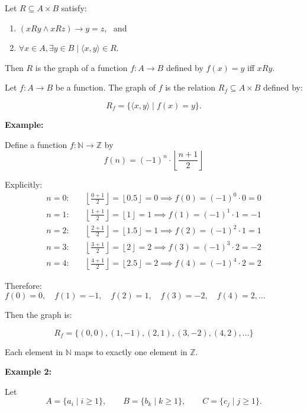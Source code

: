 \documentclass[12pt,a4paper,openany]{article}
\begin{document}
Let $R \subseteq A \times B$ satisfy:

\begin{enumerate}
\item $(xRy \land xRz) \to y = z$, \ and
\item $\forall x \in A, \exists y \in B \mid \langle x, y \rangle \in R$.
\end{enumerate}

Then $R$ is the graph of a function $f : A \to B$ defined by $f(x) = y$ iff $xRy$.

Let $f : A \to B$ be a function. The graph of $f$ is the relation $R_f \subseteq A \times B$ defined by:

\[
R_f = \{ \langle x, y \rangle \mid f(x) = y \}.
\]

\textbf{Example:}

Define a function $f : \mathbb{N} \to \mathbb{Z}$ by
\[
f(n) = (-1)^n \cdot \left\lfloor \frac{n+1}{2} \right\rfloor
\]

Explicitly:
\[
\begin{aligned}
n = 0: & \quad \left\lfloor \frac{0+1}{2} \right\rfloor = \left\lfloor 0.5 \right\rfloor = 0 \implies f(0) = (-1)^0 \cdot 0 = 0 \\
n = 1: & \quad \left\lfloor \frac{1+1}{2} \right\rfloor = \left\lfloor 1 \right\rfloor = 1 \implies f(1) = (-1)^1 \cdot 1 = -1 \\
n = 2: & \quad \left\lfloor \frac{2+1}{2} \right\rfloor = \left\lfloor 1.5 \right\rfloor = 1 \implies f(2) = (-1)^2 \cdot 1 = 1 \\
n = 3: & \quad \left\lfloor \frac{3+1}{2} \right\rfloor = \left\lfloor 2 \right\rfloor = 2 \implies f(3) = (-1)^3 \cdot 2 = -2 \\
n = 4: & \quad \left\lfloor \frac{4+1}{2} \right\rfloor = \left\lfloor 2.5 \right\rfloor = 2 \implies f(4) = (-1)^4 \cdot 2 = 2
\end{aligned}
\]

Therefore: $f(0) = 0, \quad f(1) = -1, \quad f(2) = 1, \quad f(3) = -2, \quad f(4) = 2, \ldots$

Then the graph is:

\[R_f = \{(0,0), (1,-1), (2,1), (3,-2), (4,2), \ldots\}\]

Each element in $\mathbb{N}$ maps to exactly one element in $\mathbb{Z}$.

\textbf{Example 2:}

Let
\[
A = \{a_i \mid i \ge 1\},\qquad
B = \{b_k \mid k \ge 1\},\qquad
C = \{c_j \mid j \ge 1\}.
\]
\end{document}
